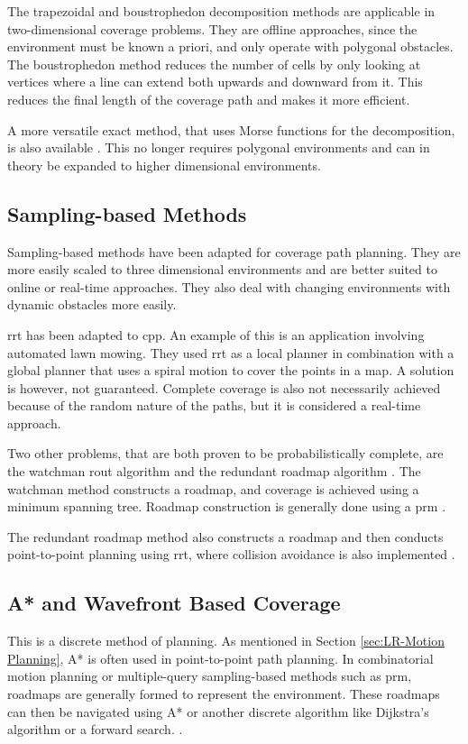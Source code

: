 The trapezoidal and boustrophedon decomposition methods are applicable in two-dimensional coverage problems. They are offline approaches, since the environment must be known a priori, and only operate with polygonal obstacles. The boustrophedon method reduces the number of cells by only looking at vertices where a line can extend both upwards and downward from it. This reduces the final length of the coverage path and makes it more efficient. \cite{CPP-Survey-2013} 

A more versatile exact method, that uses Morse functions for the decomposition, is also available \cite{Choset-Morse2000}. This no longer requires polygonal environments and can in theory be expanded to higher dimensional environments.
\subsection{Sampling-based Methods}
\label{sec:LR - sSampling}
Sampling-based methods have been adapted for coverage path planning. They are more easily scaled to three dimensional environments and are better suited to online or real-time approaches. They also deal with changing environments with dynamic obstacles more easily. 

\ac{rrt} has been adapted to \ac{cpp}. An example of this is an application involving automated lawn mowing. They used \ac{rrt} as a local planner in combination with a global planner that uses a spiral motion to cover the points in a map. A solution is however, not guaranteed. Complete coverage is also not necessarily achieved because of the random nature of the paths, but it is considered a real-time approach. \cite{Nourani-Vatani2006}

Two other problems, that are both proven to be probabilistically complete, are the watchman rout algorithm and the redundant roadmap algorithm \cite{Englot2012}. The watchman method constructs a roadmap, and coverage is achieved using a minimum spanning tree. Roadmap construction is generally done using a \ac{prm} \cite{Danner2000}.%

The redundant roadmap method also constructs a roadmap and then conducts point-to-point planning using \ac{rrt}, where collision avoidance is also implemented \cite{Englot2011}.
\subsection{A* and Wavefront Based Coverage}
\label{sec:LR - sA*}
This is a discrete method of planning. As mentioned in Section \ref{sec:LR-Motion Planning}, A* is often used in point-to-point path planning. In combinatorial motion planning or multiple-query sampling-based methods such as \ac{prm}, roadmaps are generally formed to represent the environment. These roadmaps can then be navigated using A* or another discrete algorithm like Dijkstra's algorithm or a forward search. \cite{Lavalle2006}.

